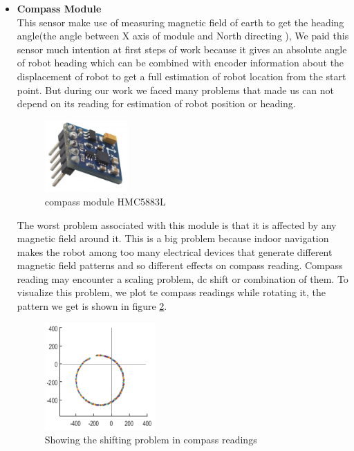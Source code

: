 \documentclass[12pt]{book}
\begin{document}
\begin{itemize}
	
	\item \textbf{Compass Module}\\
	This sensor make use of measuring magnetic field of earth to get the heading angle(the angle between X axis of module and North directing ), We paid this sensor much intention at first steps of work because it gives an absolute angle of robot heading which can be combined with encoder information about the displacement of robot to get a full estimation of robot location from the start point. But during our work we faced many problems that made us can not depend on its reading for estimation of robot position or heading. \\
	\begin{figure}
		\centering
		\includegraphics[width =0.3\textwidth]{Fig/Electronics/compass.jpg}
		\caption{compass module HMC5883L}
		\label{fig:compass}
	\end{figure}
	The worst problem associated with this module is that it is affected by any magnetic field around it. This is a big problem because indoor navigation makes the robot among too many electrical devices that generate different magnetic field patterns and so different effects on compass reading. Compass reading may encounter a scaling problem, dc shift or combination of them.
	To visualize this problem, we plot te compass readings while rotating it, the pattern we get is shown in figure \ref{fig:compass-sh}.\\
	\begin{figure}
		\centering
		\includegraphics[width =0.4\textwidth]{Fig/compass-sh.png}
		\caption{Showing the shifting problem in compass readings}
		\label{fig:compass-sh}
	\end{figure}

\end{itemize}
\end{document}
